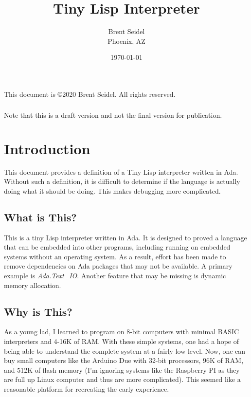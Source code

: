 \documentclass[10pt, openany]{book}
\title{Tiny Lisp Interpreter}
\author{Brent Seidel \\ Phoenix, AZ}
\date{ \today }
\begin{document}
%
%
\frontmatter
\maketitle
\begin{center}
This document is \copyright 2020 Brent Seidel.  All rights reserved.

\paragraph{}Note that this is a draft version and not the final version for publication.
\end{center}
\tableofcontents

\mainmatter
\chapter{Introduction}
This document provides a definition of a Tiny Lisp interpreter written in Ada.  Without such a definition, it is difficult to determine if the language is actually doing what it should be doing.  This makes debugging more complicated.

\section{What is This?}
This is a tiny Lisp interpreter written in Ada.  It is designed to proved a language that can be embedded into other programs, including running on embedded systems without an operating system.  As a result, effort has been made to remove dependencies on Ada packages that may not be available.  A primary example is \emph{Ada.Text\_IO}.  Another feature that may be missing is dynamic memory allocation.

\section{Why is This?}
As a young lad, I learned to program on 8-bit computers with minimal BASIC interpreters and 4-16K of RAM.  With these simple systems, one had a hope of being able to understand the complete system at a fairly low level.  Now, one can buy small computers like the Arduino Due with 32-bit processors, 96K of RAM, and 512K of flash memory (I'm ignoring systems like the Raspberry PI as they are full up Linux computer and thus are more complicated).  This seemed like a reasonable platform for recreating the early experience.
\end{document}
